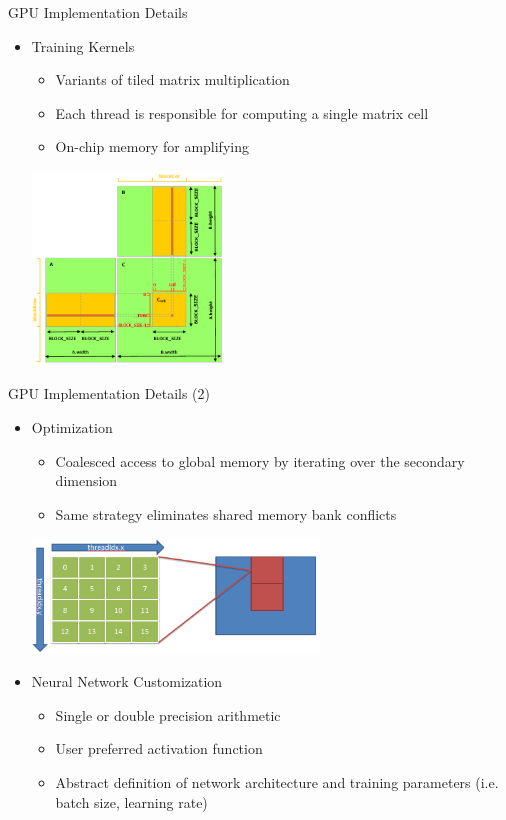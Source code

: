 \begin{frame}{GPU Implementation Details}
\begin{itemize}
\item{Training Kernels}
\begin{itemize}
\item{ Variants of tiled matrix multiplication }
\item{ Each thread is responsible for computing a single matrix cell }
\item{ On-chip memory for amplifying }
\end{itemize}

\includegraphics[width=2.0in]{matrix-multiplication-with-shared-memory.png}



\end{itemize}
\end{frame}

\begin{frame}{GPU Implementation Details (2)}
\begin{itemize}

\item{Optimization}
\begin{itemize}
\item{Coalesced access to global memory by iterating over the secondary dimension}
\item{Same strategy eliminates shared memory bank conflicts }
\end{itemize}

\includegraphics[width=3.0in]{gpu_mem_access.png}

\item{Neural Network Customization}
\begin{itemize}
\item{Single or double precision arithmetic}
\item{User preferred activation function}
\item{Abstract definition of network architecture and training parameters (i.e. batch size, learning rate) }

\end{itemize}


\end{itemize}
\end{frame}
    
